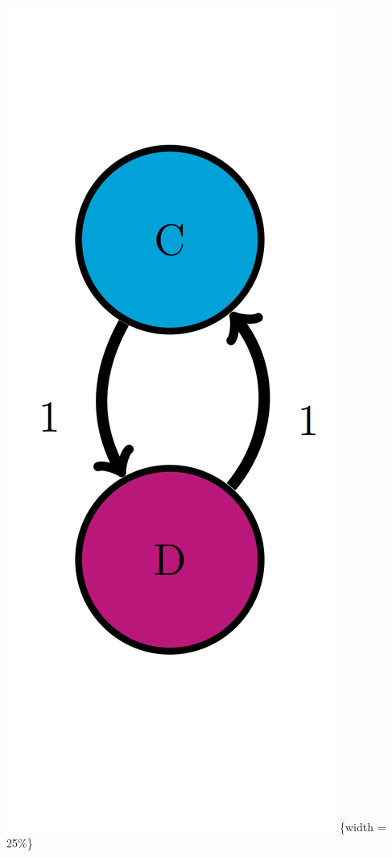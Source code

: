 \documentclass[
]{book}
\theoremstyle{definition}
\theoremstyle{definition}
\theoremstyle{definition}
\theoremstyle{remark}
\begin{document}
\includegraphics{ch10/CD_trans_diag.png}\{width = 25\%\}
\end{document}
